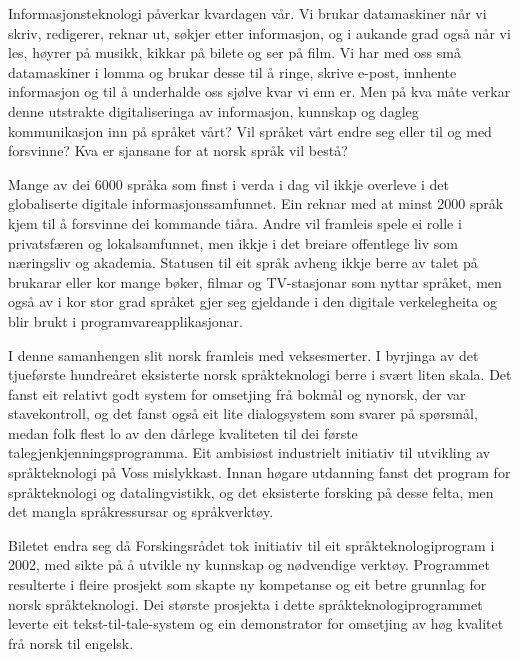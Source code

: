 
\begin{multicols}{2}

Informasjonsteknologi påverkar kvardagen vår. Vi brukar datamaskiner når vi skriv, redigerer, reknar ut, søkjer etter informasjon, og i aukande grad også når vi les, høyrer på musikk, kikkar på bilete og ser på film. Vi har med oss små datamaskiner i lomma og brukar desse til å ringe, skrive e-post, innhente informasjon og til å underhalde oss sjølve kvar vi enn er. Men på kva måte verkar denne utstrakte digitaliseringa av informasjon, kunnskap og dagleg kommunikasjon inn på språket vårt? Vil språket vårt endre seg eller til og med forsvinne? Kva er sjansane for at norsk språk vil bestå?        

Mange av dei 6000 språka som finst i verda i dag vil ikkje overleve i det globaliserte digitale informasjonssamfunnet. Ein reknar med at minst 2000 språk kjem til å forsvinne dei kommande tiåra.  Andre vil framleis spele ei rolle i privatsfæren og lokalsamfunnet, men ikkje i det breiare offentlege liv som næringsliv og akademia. Statusen til eit språk avheng ikkje berre av talet på brukarar eller kor mange bøker, filmar og TV-stasjonar som nyttar språket, men også av i kor stor grad språket gjer seg gjeldande i den digitale verkelegheita og blir brukt i programvareapplikasjonar. 

I denne samanhengen slit norsk framleis med veksesmerter. I byrjinga av det tjueførste hundreåret eksisterte norsk språkteknologi berre i svært liten skala. Det fanst eit relativt godt system for omsetjing frå bokmål og nynorsk, der var stavekontroll, og det fanst også eit lite dialogsystem som svarer på spørsmål, medan folk flest lo av den dårlege kvaliteten til dei første talegjenkjenningsprogramma. Eit ambisiøst industrielt initiativ til utvikling av språkteknologi på Voss mislykkast. Innan høgare utdanning fanst det program for språkteknologi og datalingvistikk, og det eksisterte forsking på desse felta, men det mangla språkressursar og språkverktøy.            

Biletet endra seg då Forskingsrådet tok initiativ til eit språkteknologiprogram i 2002, med sikte på å utvikle ny kunnskap og nødvendige verktøy. Programmet resulterte i fleire prosjekt som skapte ny kompetanse og eit betre grunnlag for norsk språkteknologi. Dei største prosjekta i dette språkteknologiprogrammet leverte eit tekst-til-tale-system og ein demonstrator for omsetjing av høg kvalitet frå norsk til engelsk.


\end{multicols}
